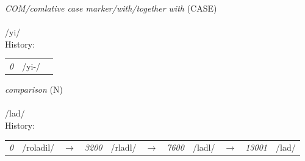 \vspace{15pt}
\begin{nopagebreak}
 \textit{COM/comlative case marker/with/together with} (CASE)\\
\\
\noindent /y{\textprimstress}i/\\


\noindent History:

\vspace{-0pt}
\hspace{40pt}
\begin{tabular}{ccc}
\textit{0} & /yi-/& \\
\end{tabular}

\vspace{20pt}\hline

\end{nopagebreak}
\filbreak



\vspace{15pt}
\begin{nopagebreak}
 \textit{comparison} (N)\\
\\
\noindent /l{\textprimstress}ad/\\


\noindent History:

\vspace{-0pt}
\hspace{40pt}
\begin{tabular}{ccc}
\textit{0} & /roladil/&$\rightarrow$ & \textit{3200} & /rladl/&$\rightarrow$ & \textit{7600} & /ladl/&$\rightarrow$ & \textit{13001} & /lad/& \\
\end{tabular}

\vspace{20pt}\hline

\end{nopagebreak}
\filbreak



